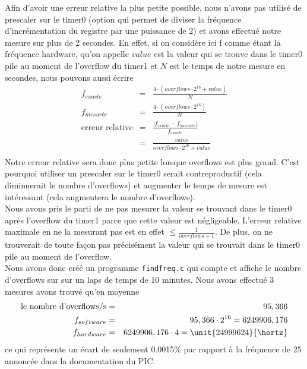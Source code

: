 \documentclass[12pt,a4paper]{article}
\begin{document}
 Afin d'avoir une erreur relative la plus petite possible, nous n'avons pas utilisé de prescaler sur le timer0 (option qui permet de diviser la fréquence d'incrémentation du registre par une puissance de 2) et avons effectué notre mesure sur plus de 2 secondes. En effet, si on considère ici f comme étant la fréquence hardware, qu'on appelle $value$ est la valeur qui se trouve dans le timer0 pile au moment de l'overflow du timer1 et $N$ est le temps de notre mesure en secondes, nous pouvons aussi écrire
 \begin{eqnarray*}
 f_{exacte} &=& \frac{4 \cdot (overflows \cdot 2^{16} + value)}{N}\\
f_{mesurée} &=&  \frac{4 \cdot (overflows \cdot 2^{16})}{N}\\
 \text{erreur relative} &=& \frac{|f_{exacte} - f_{mesurée}|}{f_{exacte}}\\
                      &=& \frac{value}{overflows \cdot 2^{16} + value}\\
\end{eqnarray*}
 Notre erreur relative sera donc plus petite lorsque overflows est plus grand. C'est pourquoi utiliser un prescaler sur le timer0 serait contreproductif (cela diminuerait le nombre d'overflows) et augmenter le temps de mesure est intéressant (cela augmentera le nombre d'overflows).\\
 
 Nous avons pris le parti de ne pas mesurer la valeur se trouvant dans le timer0 après l'overflow du timer1 parce que cette valeur est négligeable. L'erreur relative maximale en ne la mesurant pas est en effet $\leq \frac{1}{overflows + 1}$. De plus, on ne trouverait de toute façon pas précisément la valeur qui se
 trouvait dans le timer0 pile au moment de l'overflow.\\
 
Nous avons donc créé un programme \texttt{findfreq.c} qui compte et affiche le nombre d'overflows sur sur un laps de temps de 10 minutes. Nous avons effectué 3 mesures avons trouvé qu'en moyenne
  \begin{eqnarray*}
 \text{le nombre d'overflows/s} &=& 95,366\\
f_{software}  &=& 95,366 \cdot 2^{16} = 6249906,176\\
f_{hardware} &=& 6249906,176 \cdot 4 = \unit{24999624}{\hertz}
 \end{eqnarray*}
 ce qui représente un écart de seulement 0.0015\% par rapport à la fréquence de \unit{25}{\mega\hertz} annoncée dans la documentation du PIC.
 
\end{document}
